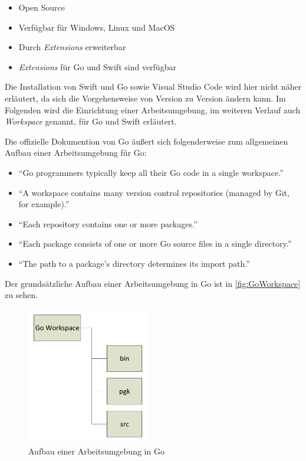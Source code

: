 \begin{itemize}
    \item Open Source
    \item Verfügbar für Windows, Linux und MacOS
    \item Durch \textit{Extensions} erweiterbar
    \item \textit{Extensions} für Go und Swift sind verfügbar
\end{itemize}

Die Installation von Swift und Go sowie Visual Studio Code wird hier nicht näher erläutert, da sich die Vorgehensweise von Version zu Version ändern kann.
Im Folgenden wird die Einrichtung einer Arbeitsumgebung, im weiteren Verlauf auch \textit{Workspace} genannt, für Go und Swift erläutert.

Die offizielle Dokumention von Go \cite[]{GoDoc.Workspaces} äußert sich folgenderweise zum allgemeinen Aufbau einer Arbeitsumgebung für Go:

\begin{itemize}
    \item \enquote{Go programmers typically keep all their Go code in a single workspace.}
    \item \enquote{A workspace contains many version control repositories (managed by Git, for example).} 
    \item \enquote{Each repository contains one or more packages.}
    \item \enquote{Each package consists of one or more Go source files in a single directory.}
    \item \enquote{The path to a package's directory determines its import path.}
\end{itemize}

Der grundsätzliche Aufbau einer Arbeitsumgebung in Go ist in \autoref{fig:GoWorkspace} zu sehen. 

\begin{figure}[H]
    \centering
    \includegraphics[height=6cm]{Images/GoWorkspace}
    \caption{Aufbau einer Arbeitsumgebung in Go}
    \label{fig:GoWorkspace}
\end{figure}

